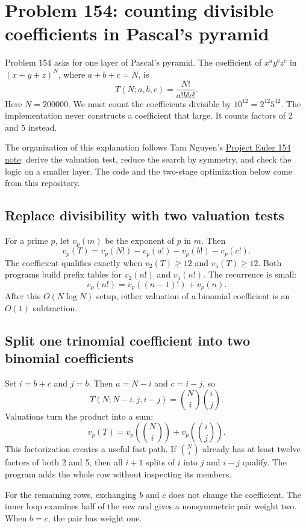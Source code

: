 \section{Problem 154: counting divisible coefficients in Pascal's pyramid}
\label{sec:p154}

Problem 154 asks for one layer of Pascal's pyramid. The coefficient of
$x^a y^b z^c$ in $(x+y+z)^N$, where $a+b+c=N$, is
\[
  T(N;a,b,c)=\frac{N!}{a!b!c!}.
\]
Here $N=200000$. We must count the coefficients divisible by
$10^{12}=2^{12}5^{12}$. The implementation never constructs a coefficient
that large. It counts factors of 2 and 5 instead.

The organization of this explanation follows Tam Nguyen's
\href{https://tamnd.github.io/brain/practice/euler/154/}{Project Euler 154
note}: derive the valuation test, reduce the search by symmetry, and check the
logic on a smaller layer. The code and the two-stage optimization below come
from this repository.

\subsection{Replace divisibility with two valuation tests}

For a prime $p$, let $v_p(m)$ be the exponent of $p$ in $m$. Then
\[
 v_p(T)=v_p(N!)-v_p(a!)-v_p(b!)-v_p(c!).
\]
The coefficient qualifies exactly when $v_2(T)\geq12$ and
$v_5(T)\geq12$. Both programs build prefix tables for $v_2(n!)$ and
$v_5(n!)$. The recurrence is small:
\[
 v_p(n!)=v_p((n-1)!)+v_p(n).
\]
After this $O(N\log N)$ setup, either valuation of a binomial coefficient is
an $O(1)$ subtraction.

\subsection{Split one trinomial coefficient into two binomial coefficients}

Set $i=b+c$ and $j=b$. Then $a=N-i$ and $c=i-j$, so
\[
 T(N;N-i,j,i-j)=\binom{N}{i}\binom{i}{j}.
\]
Valuations turn the product into a sum:
\[
 v_p(T)=v_p\!\left(\binom{N}{i}\right)
       +v_p\!\left(\binom{i}{j}\right).
\]
This factorization creates a useful fast path. If $\binom{N}{i}$ already has
at least twelve factors of both 2 and 5, then all $i+1$ splits of $i$ into
$j$ and $i-j$ qualify. The program adds the whole row without inspecting its
members.

For the remaining rows, exchanging $b$ and $c$ does not change the
coefficient. The inner loop examines half of the row and gives a nonsymmetric
pair weight two. When $b=c$, the pair has weight one.

